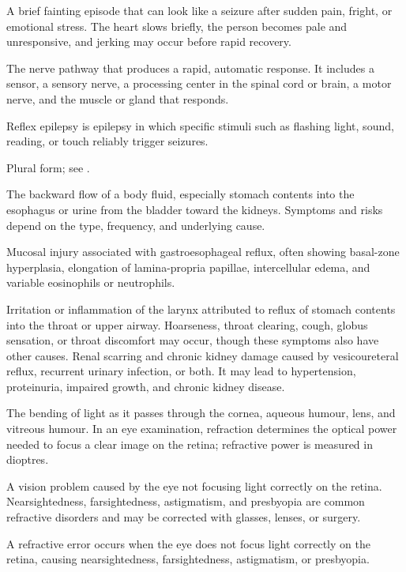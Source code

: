  A brief fainting episode that can look like a seizure after sudden pain, fright, or emotional stress. The heart slows briefly, the person becomes pale and unresponsive, and jerking may occur before rapid recovery.

 The nerve pathway that produces a rapid, automatic response. It includes a sensor, a sensory nerve, a processing center in the spinal cord or brain, a motor nerve, and the muscle or gland that responds.

 Reflex epilepsy is epilepsy in which specific stimuli such as flashing light, sound, reading, or touch reliably trigger seizures.

 Plural form; see .

 The backward flow of a body fluid, especially stomach contents into the esophagus or urine from the bladder toward the kidneys. Symptoms and risks depend on the type, frequency, and underlying cause.

 Mucosal injury associated with gastroesophageal reflux, often showing basal-zone hyperplasia, elongation of lamina-propria papillae, intercellular edema, and variable eosinophils or neutrophils.

 Irritation or inflammation of the larynx attributed to reflux of stomach contents into the throat or upper airway. Hoarseness, throat clearing, cough, globus sensation, or throat discomfort may occur, though these symptoms also have other causes.
 Renal scarring and chronic kidney damage caused by vesicoureteral reflux, recurrent
urinary infection, or both. It may lead to hypertension, proteinuria, impaired growth,
and chronic kidney disease.

 The bending of light as it passes through the cornea, aqueous humour, lens, and vitreous humour. In an eye examination, refraction determines the optical power needed to focus a clear image on the retina; refractive power is measured in dioptres.

 A vision problem caused by the eye not focusing light correctly on the retina. Nearsightedness, farsightedness, astigmatism, and presbyopia are common refractive disorders and may be corrected with glasses, lenses, or surgery.

 A refractive error occurs when the eye does not focus light correctly on the retina, causing nearsightedness, farsightedness, astigmatism, or presbyopia.

